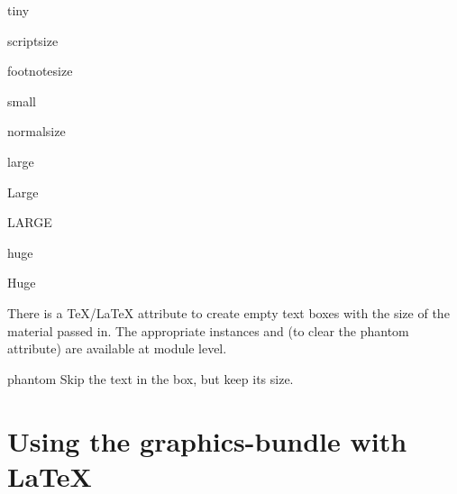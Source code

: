 \begin{memberdesc}{tiny}
\end{memberdesc}

\begin{memberdesc}{scriptsize}
\end{memberdesc}

\begin{memberdesc}{footnotesize}
\end{memberdesc}

\begin{memberdesc}{small}
\end{memberdesc}

\begin{memberdesc}{normalsize}
\end{memberdesc}

\begin{memberdesc}{large}
\end{memberdesc}

\begin{memberdesc}{Large}
\end{memberdesc}

\begin{memberdesc}{LARGE}
\end{memberdesc}

\begin{memberdesc}{huge}
\end{memberdesc}

\begin{memberdesc}{Huge}
\end{memberdesc}

There is a \TeX/\LaTeX{} attribute to create empty text boxes with the
size of the material passed in. The appropriate instances
 and  (to clear the phantom
attribute) are available at module level.

\begin{datadesc}{phantom}
  Skip the text in the box, but keep its size.
\end{datadesc}

\section[Using the graphics-bundle with LaTeX]%
{Using the graphics-bundle with \LaTeX}

